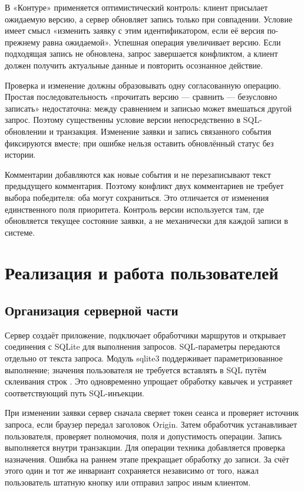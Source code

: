 \documentclass{timcw}
\begin{document}
В «Контуре» применяется оптимистический контроль: клиент присылает ожидаемую версию, а сервер обновляет запись только при совпадении. Условие имеет смысл «изменить заявку с этим идентификатором, если её версия по-прежнему равна ожидаемой». Успешная операция увеличивает версию. Если подходящая запись не обновлена, запрос завершается конфликтом, а клиент должен получить актуальные данные и повторить осознанное действие.

Проверка и изменение должны образовывать одну согласованную операцию. Простая последовательность «прочитать версию — сравнить — безусловно записать» недостаточна: между сравнением и записью может вмешаться другой запрос. Поэтому существенны условие версии непосредственно в SQL-обновлении и транзакция. Изменение заявки и запись связанного события фиксируются вместе; при ошибке нельзя оставить обновлённый статус без истории.

Комментарии добавляются как новые события и не перезаписывают текст предыдущего комментария. Поэтому конфликт двух комментариев не требует выбора победителя: оба могут сохраниться. Это отличается от изменения единственного поля приоритета. Контроль версии используется там, где обновляется текущее состояние заявки, а не механически для каждой записи в системе.

\chapter{Реализация и работа пользователей}

\section{Организация серверной части}

Сервер создаёт приложение, подключает обработчики маршрутов и открывает соединения с SQLite для выполнения запросов. SQL-параметры передаются отдельно от текста запроса. Модуль sqlite3 поддерживает параметризованное выполнение; значения пользователя не требуется вставлять в SQL путём склеивания строк \cite{src6}. Это одновременно упрощает обработку кавычек и устраняет соответствующий путь SQL-инъекции.

При изменении заявки сервер сначала сверяет токен сеанса и проверяет источник запроса, если браузер передал заголовок Origin. Затем обработчик устанавливает пользователя, проверяет полномочия, поля и допустимость операции. Запись выполняется внутри транзакции. Для операции техника добавляется проверка назначения. Ошибка на раннем этапе прекращает обработку до записи. За счёт этого один и тот же инвариант сохраняется независимо от того, нажал пользователь штатную кнопку или отправил запрос иным клиентом.
\end{document}
